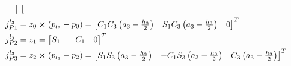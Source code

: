 \begin{minipage}[h]{0.6\textwidth}
\begin{align*}
\begin{bmatrix}
\end{bmatrix}\\
j_{P1}^{l_3}&=z_0\cross(p_{l_3}-p_{0})=\begin{bmatrix}
C_1C_3\left(a_3-\frac{h_3}{2}\right)&
S_1C_3\left(a_3-\frac{h_3}{2}\right)&
                                      0
\end{bmatrix}^T\\
j_{P2}^{l_3}&=z_1=\begin{bmatrix}
 S_1&
 -C_1&
    0
\end{bmatrix}^T\\
j_{P3}^{l_3}&=z_2\cross(p_{l_3}-p_{2})=\begin{bmatrix}
   S_1S_3\left(a_3-\frac{h_3}{2}\right)&
-C_1S_3\left(a_3-\frac{h_3}{2}\right)&
             C_3\left(a_3-\frac{h_3}{2}\right) 
\end{bmatrix}^T
\end{align*}
\end{minipage}
\hspace{0.25cm}

